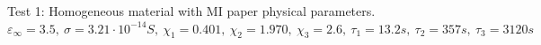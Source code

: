 \documentclass[11pt,a4paper]{article}
\begin{document}
\begin{figure}
{	}
	\hspace*{0.01\textwidth}
	\caption{Test 1: Homogeneous material with MI paper physical parameters. \(\varepsilon_\infty = 3.5,\ \sigma = 3.2 1\cdot 10^{-14}S,\ \chi_1 = 0.401,\ \chi_2 = 1.970,\ \chi_3 = 2.6,\ \tau_1 = 13.2s,\ \tau_2 = 357s,\ \tau_3 = 3120s\)}
	\label{fig:test1}
	
\end{figure}
\end{document}
